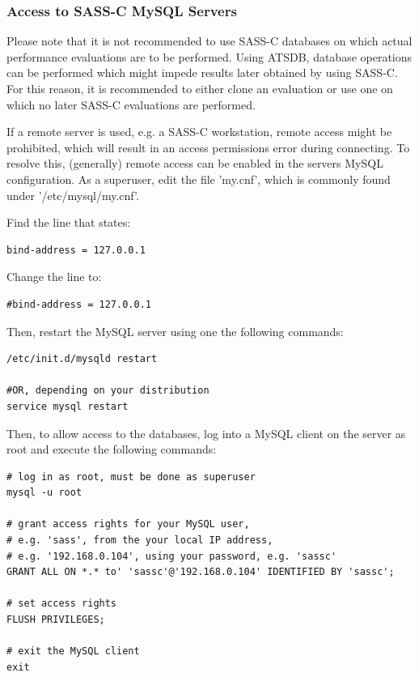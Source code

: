 \documentclass[10pt,letterpaper,extrafontsizes]{memoir}
\begin{document}
\subsubsection{Access to SASS-C MySQL Servers}

Please note that it is not recommended to use SASS-C databases on which actual performance evaluations are to be performed. Using ATSDB, database operations can be performed which might impede results later obtained by using SASS-C. For this reason, it is recommended to either clone an evaluation or use one on which no later SASS-C evaluations are performed.

If a remote server is used, e.g. a SASS-C workstation, remote access might be prohibited, which will result in an access permissions error during connecting. To resolve this, (generally) remote access can be enabled in the servers MySQL configuration. As a superuser, edit the file 'my.cnf', which is commonly found under '/etc/mysql/my.cnf'. 

Find the line that states:
\begin{verbatim}
bind-address = 127.0.0.1
\end{verbatim}

Change the line to:

\begin{verbatim}
#bind-address = 127.0.0.1
\end{verbatim}

Then, restart the MySQL server using one the following commands:

\begin{verbatim}
/etc/init.d/mysqld restart

#OR, depending on your distribution
service mysql restart
\end{verbatim}

Then, to allow access to the databases, log into a MySQL client on the server as root and execute the following commands:

\begin{verbatim}
# log in as root, must be done as superuser
mysql -u root

# grant access rights for your MySQL user, 
# e.g. 'sass', from the your local IP address, 
# e.g. '192.168.0.104', using your password, e.g. 'sassc'
GRANT ALL ON *.* to' 'sassc'@'192.168.0.104' IDENTIFIED BY 'sassc';

# set access rights
FLUSH PRIVILEGES;

# exit the MySQL client
exit
\end{verbatim}
\end{document}
